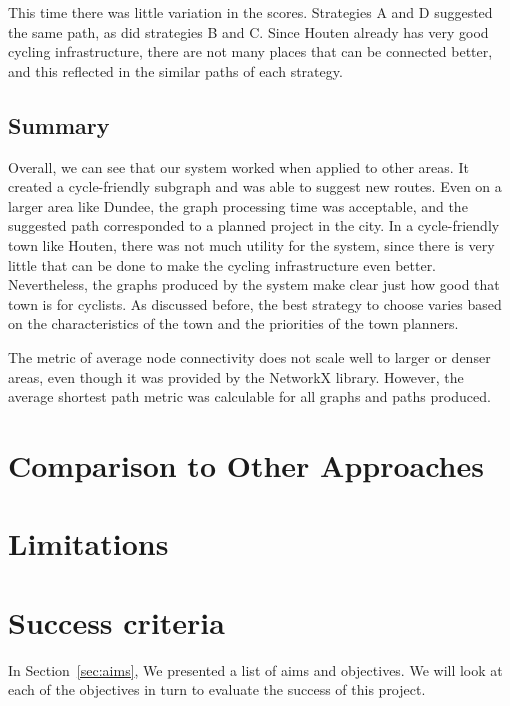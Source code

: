 \documentclass[12pt,a4paper]{report}
\begin{document}
This time there was little variation in the scores. Strategies A and D suggested the same path, as did strategies B and C. Since Houten already has very good cycling infrastructure, there are not many places that can be connected better, and this reflected in the similar paths of each strategy.

\subsection{Summary}
Overall, we can see that our system worked when applied to other areas. It created a cycle-friendly subgraph and was able to suggest new routes. Even on a larger area like Dundee, the graph processing time was acceptable, and the suggested path corresponded to a planned project in the city. In a cycle-friendly town like Houten, there was not much utility for the system, since there is very little that can be done to make the cycling infrastructure even better. Nevertheless, the graphs produced by the system make clear just how good that town is for cyclists. As discussed before, the best strategy to choose varies based on the characteristics of the town and the priorities of the town planners.

The metric of average node connectivity does not scale well to larger or denser areas, even though it was provided by the NetworkX library. However, the average shortest path metric was calculable for all graphs and paths produced.

\section{Comparison to Other Approaches}

\section{Limitations}

\section{Success criteria}
In Section~\ref{sec:aims}, We presented a list of aims and objectives. We will look at each of the objectives in turn to evaluate the success of this project.
\end{document}
